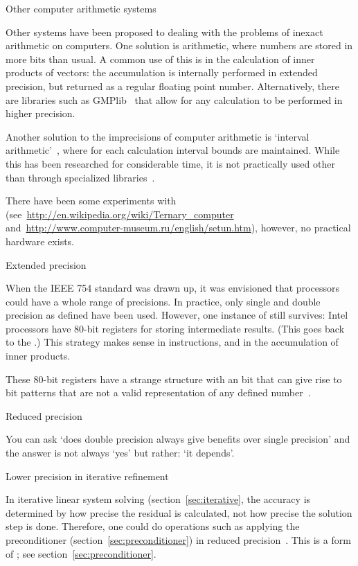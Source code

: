  {Other computer arithmetic systems}

Other systems have been proposed to dealing with the problems of
inexact arithmetic on computers. One solution is 
arithmetic, where numbers are stored in more bits than usual. A common
use of this is in the calculation of inner products of vectors: the
accumulation is internally performed in extended precision, but
returned as a regular floating point number. Alternatively, there are
libraries such as GMPlib~\cite{gmplib} that allow for any calculation
to be performed in higher precision.

Another solution to the imprecisions of computer arithmetic is `interval
arithmetic'~\cite{wikipedia:interval-arithmetic}, where for each
calculation interval bounds are maintained. While this has been
researched for considerable time, it is not practically used other
than through specialized libraries~\cite{boost:interval-arithmetic}.

There have been some experiments with 
(see~\url{http://en.wikipedia.org/wiki/Ternary_computer}
and~\url{http://www.computer-museum.ru/english/setun.htm}), however,
no practical hardware exists.

 {Extended precision}
\label{sec:ext-prec}

When the IEEE 754 standard was drawn up, it was envisioned that 
processors could have a whole range of precisions. In practice,
only single and double precision as defined have been used.
However, one instance of  still survives:
Intel processors have 80-bit registers for storing intermediate results.
(This goes back to the .)
This strategy makes sense in  instructions, 
and in the accumulation of inner products.

These 80-bit registers have a strange structure
with an  bit
that can give rise to bit patterns that are not 
a valid representation of any defined number~\cite{mostlyharmless80bit}.

 {Reduced precision}

You can ask `does double precision always give benefits over single
precision' and the answer is not always `yes' but rather: `it
depends'.

 {Lower precision in iterative refinement}

In iterative linear system solving (section~\ref{sec:iterative}, the
accuracy is determined by how precise the residual is calculated, not
how precise the solution step is done. Therefore, one could do
operations such as applying the preconditioner
(section~\ref{sec:preconditioner}) in reduced
precision~\cite{Dongarra:mixed-refinement}. This is a form of
; see
section~\ref{sec:preconditioner}.

